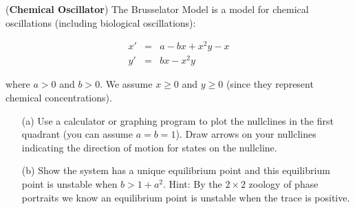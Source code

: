\documentclass[11pt,letterpaper,boxed]{pset}
\begin{document}
    
    \begin{problem} [Exercise 4. ]
        (\textbf{Chemical Oscillator}) The Brusselator Model is a model for chemical oscillations (including biological oscillations):
        
        \begin{eqnarray}
            \label{al2}
            x' & = & a - b x + x^2 y - x \\
            \label{be2}
            y' & = & b x - x^2 y
        \end{eqnarray}
        
        where $a > 0$ and $b > 0$. We assume $x \geq0$ and $y \geq 0$ (since they represent chemical concentrations). 
        
        \begin{enumerate}
            \item[(a)] Use a calculator or graphing program to plot the nullclines in the first quadrant (you can assume $a=b=1$). Draw arrows on your nullclines indicating the direction of motion for states on the nullcline. 
            \item[(b)] Show the system has a unique equilibrium point and this equilibrium point is unstable when $b > 1 + a^2$. Hint: By the $2 \times 2$ zoology of phase portraits we know an equilibrium point is unstable when the trace is positive. 
        \end{enumerate}
    \end{problem}
    \newpage
\end{document}
